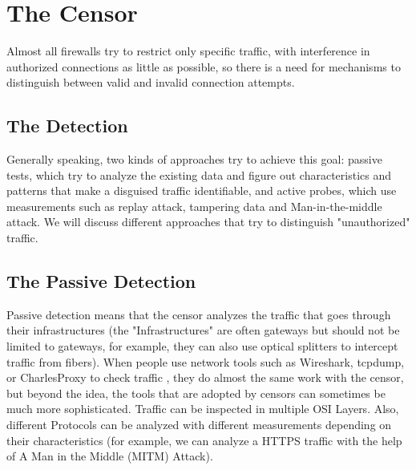 \documentclass[conference]{IEEEtran}
\begin{document}
\section{The Censor}
Almost all firewalls try to restrict only specific traffic, with interference in authorized connections as little as possible, so there is a need for mechanisms to distinguish between valid and invalid connection attempts.

\subsection{The Detection}
Generally speaking, two kinds of approaches try to achieve this goal: passive tests, which try to analyze the existing data and figure out characteristics and patterns that make a disguised traffic identifiable, and active probes, which use measurements such as replay attack, tampering data and Man-in-the-middle attack. We will discuss different approaches that try to distinguish "unauthorized" traffic.

\subsection{The Passive Detection}
Passive detection means that the censor analyzes the traffic that goes through their infrastructures (the "Infrastructures" are often gateways but should not be limited to gateways, for example, they can also use optical splitters to intercept traffic from fibers). When people use network tools such as Wireshark, tcpdump, or CharlesProxy to check traffic , they do almost the same work with the censor, but beyond the idea, the tools that are adopted by censors can sometimes be much more sophisticated. Traffic can be inspected in multiple OSI Layers. Also, different Protocols can be analyzed with different measurements depending on their characteristics (for example, we can analyze a HTTPS traffic with the help of A Man in the Middle (MITM) Attack).
\end{document}
